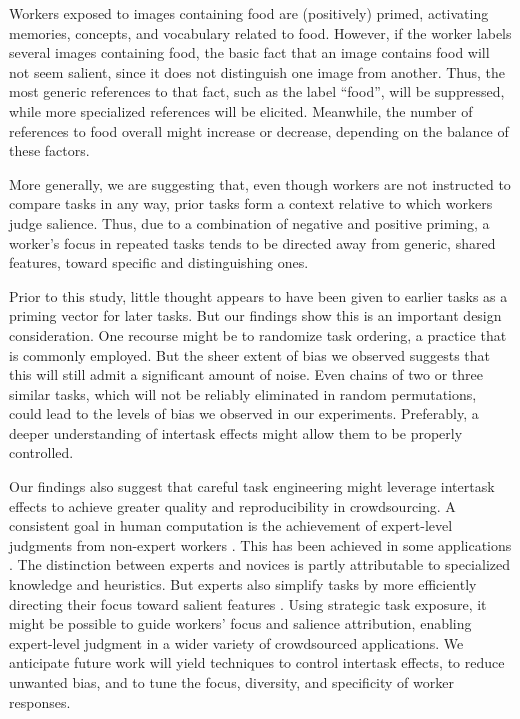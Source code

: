\documentclass[12pt]{article}
\begin{document}
Workers exposed to images containing food are (positively) primed, 
activating memories, concepts, and vocabulary related to food.  
However, if the worker labels several images containing food, the basic 
fact that an image contains food will not seem salient, since it 
does not distinguish one image from another.  Thus, the most 
generic references to that fact, such as the label ``food'', 
will be suppressed, while more specialized references will be elicited.  
Meanwhile, the number of references to food overall might increase or 
decrease, depending on the balance of these factors.  

More generally, we are suggesting that, even though workers are not 
instructed to compare tasks in any way, prior tasks form a 
context relative to which workers judge salience.  Thus, due to a combination 
of negative and positive priming, a worker's focus 
in repeated tasks tends to be directed away from generic, shared features, 
toward specific and distinguishing ones.

Prior to this study, little thought appears to have been given to
earlier tasks as a priming vector for later tasks.
But our findings show this is an important design consideration.  
One recourse might be to randomize task ordering, a practice that is 
commonly employed.  But the sheer extent of bias we observed suggests that 
this will still admit a significant amount of noise.  
Even chains of two or three similar tasks, which
will not be reliably eliminated in random permutations, could lead
to the levels of bias we observed in our experiments.
Preferably, a deeper understanding of intertask effects might allow them
to be properly controlled.

Our findings also suggest that careful task engineering might leverage
intertask effects to achieve greater quality and reproducibility in 
crowdsourcing.
A consistent goal in human computation is the achievement of expert-level
judgments from non-expert workers \cite{kittur2011crowdforge}.  
This has been achieved in some
applications \cite{snow2008cheap,Mortensen20131020,Warby2014385}. 
The distinction between experts and novices is partly attributable
to specialized knowledge and heuristics. 
But experts also simplify tasks by more efficiently directing 
their focus toward salient features \cite{kellman2009perceptual}.  
Using strategic task exposure, it might be possible to guide workers' focus 
and salience attribution, enabling expert-level judgment in a wider variety of
crowdsourced applications.
We anticipate future work will yield techniques to control intertask 
effects, to reduce unwanted bias, and to tune the focus, diversity, and 
specificity of worker responses.
\end{document}
